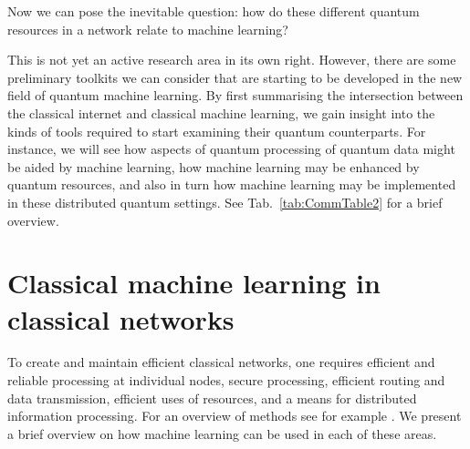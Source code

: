 \documentclass[twocolumn, aps, rmp, amsmath, amssymb, nofootinbib, superscriptaddress, longbibliography, floatfix, table-of-contents, eqsecnum]{revtex4}
\begin{document}
Now we can pose the inevitable question: how do these different quantum resources in a network relate to machine learning?

This is not yet an active research area in its own right. However, there are some preliminary toolkits we can consider that are starting to be developed in the new field of quantum machine learning. By first summarising the intersection between the classical internet and classical machine learning, we gain insight into the kinds of tools required to start examining their quantum counterparts. For instance, we will see how aspects of quantum processing of quantum data might be aided by machine learning, how machine learning may be enhanced by quantum resources, and also in turn how machine learning may be implemented in these distributed quantum settings. See Tab.~\ref{tab:CommTable2} for a brief overview. 


\section{Classical machine learning in classical networks}

To create and maintain efficient classical networks, one requires efficient and reliable processing at individual nodes, secure processing, efficient routing and data transmission, efficient uses of resources, and a means for distributed information processing. For an overview of methods see for example \cite{boutaba2018comprehensive, wang2018machine}. We present a brief overview on how machine learning can be used in each of these areas. 
\end{document}
